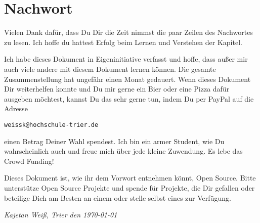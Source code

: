 \chapter{Nachwort}
Vielen Dank dafür, dass Du Dir die Zeit nimmst die paar Zeilen des Nachwortes zu lesen. Ich hoffe du hattest Erfolg beim Lernen und Verstehen der Kapitel.

Ich habe dieses Dokument in Eigeninitiative verfasst und hoffe, dass außer mir auch viele andere mit diesem Dokument lernen können. Die gesamte Zusammenstellung hat ungefähr einen Monat gedauert. Wenn dieses Dokument Dir weiterhelfen konnte und Du mir gerne ein Bier oder eine Pizza dafür ausgeben möchtest, kannst Du das sehr gerne tun, indem Du per PayPal auf die Adresse
\begin{center}
	\texttt{weissk@hochschule-trier.de}
\end{center}
einen Betrag Deiner Wahl spendest. Ich bin ein armer Student, wie Du wahrscheinlich auch und freue mich über jede kleine Zuwendung. Es lebe das Crowd Funding! \smiley  

Dieses Dokument ist, wie ihr dem Vorwort entnehmen könnt, Open Source. Bitte unterstütze Open Source Projekte und spende für Projekte, die Dir gefallen oder beteilige Dich am Besten an einem oder stelle selbst eines zur Verfügung.

\vspace{2cm}

\textsl{Kajetan Weiß, Trier den \today}